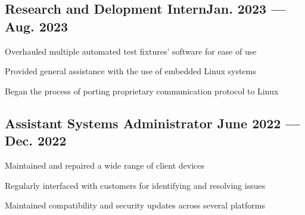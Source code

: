 \subsection{{Research and Delopment Intern\hfill Jan. 2023 --- Aug. 2023}}
\begin{zitemize}
\item Overhauled multiple automated test fixtures' software for ease of use
\item Provided general assistance with the use of embedded Linux systems
\item Began the process of porting proprietary communication protocol to Linux
\end{zitemize}

\subsection{{Assistant Systems Administrator \hfill June 2022 --- Dec. 2022}}
\begin{zitemize}
\item Maintained and repaired a wide range of client devices
\item Regularly interfaced with customers for identifying and resolving issues
\item Maintained compatibility and security updates across several platforms
\end{zitemize}
